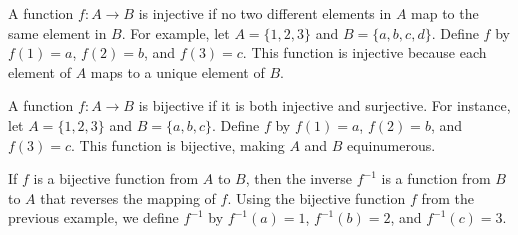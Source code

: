 		\begin{example}
			A function \( f: A \to B \) is injective if no two different elements in \( A \) map to the same element in \( B \). For example, let \( A = \{1, 2, 3\} \) and \( B = \{a, b, c, d\} \). Define \( f \) by \( f(1) = a \), \( f(2) = b \), and \( f(3) = c \). This function is injective because each element of \( A \) maps to a unique element of \( B \).
		\end{example}
		
		\begin{example}
			A function \( f: A \to B \) is bijective if it is both injective and surjective. For instance, let \( A = \{1, 2, 3\} \) and \( B = \{a, b, c\} \). Define \( f \) by \( f(1) = a \), \( f(2) = b \), and \( f(3) = c \). This function is bijective, making \( A \) and \( B \) equinumerous.
		\end{example}
		
		\begin{example}
			If \( f \) is a bijective function from \( A \) to \( B \), then the inverse \( f^{-1} \) is a function from \( B \) to \( A \) that reverses the mapping of \( f \). Using the bijective function \( f \) from the previous example, we define \( f^{-1} \) by \( f^{-1}(a) = 1 \), \( f^{-1}(b) = 2 \), and \( f^{-1}(c) = 3 \).
		\end{example}
		
